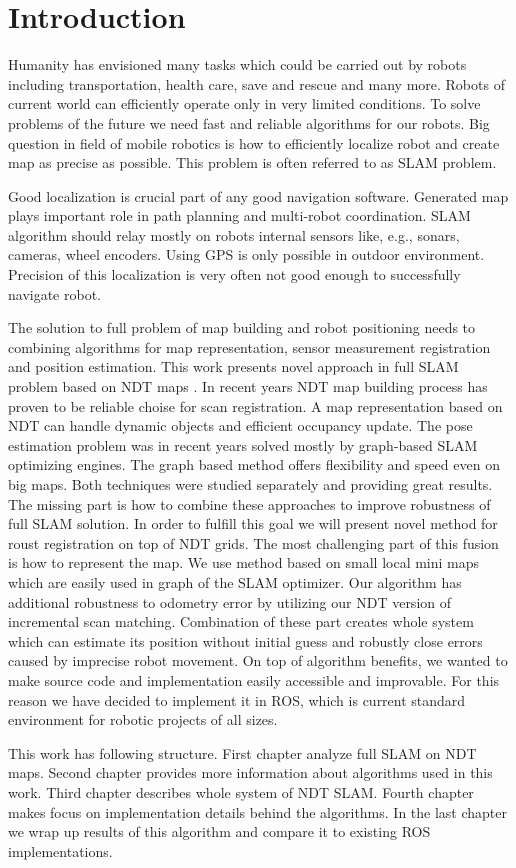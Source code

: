 \chapter*{Introduction}
Humanity has envisioned many tasks which could be carried out by robots including transportation, health care, save and rescue and many more. Robots of current world can efficiently operate only in very limited conditions. To solve problems of the future we need fast and reliable algorithms for our robots. Big question in field of mobile robotics is how to efficiently localize robot and create map as precise as possible. This problem is often referred to as \gls{SLAM} problem.

Good localization is crucial part of any good navigation software. Generated map plays important role in path planning and  multi-robot coordination. SLAM algorithm should relay mostly on robots internal sensors like, e.g., sonars, cameras, wheel encoders. Using \gls{GPS} is only possible in outdoor environment. Precision of this localization is very often not good enough to successfully navigate robot.

The solution to full problem of map building and robot positioning needs to combining algorithms for map representation, sensor measurement registration and position estimation. This work presents novel approach in full \gls{SLAM} problem based on \gls{NDT} maps . In recent years \gls{NDT} map building process has proven to be reliable choise for scan registration. A map representation based on \gls{NDT} can handle dynamic objects and efficient occupancy update. The pose estimation problem was in recent years solved mostly by graph-based \gls{SLAM} optimizing engines. The graph based method offers flexibility and speed even on big maps. Both techniques were studied separately and providing great results. The missing part is how to combine these approaches to improve robustness of full \gls{SLAM} solution. In order to fulfill this goal we will present novel method  for roust registration on top of \gls{NDT} grids. The most challenging part of this fusion is how to represent the map. We use method based on small local mini maps which are easily used in graph of the \gls{SLAM} optimizer. Our algorithm has additional robustness to odometry error by utilizing our \gls{NDT} version of incremental scan matching. Combination of these part creates whole system which can estimate its position without initial guess and robustly close errors caused by imprecise robot movement. On top of algorithm benefits, we wanted to make source code and implementation easily accessible and improvable. For this reason we have decided to implement it in \gls{ROS}, which is current standard environment for robotic projects of all sizes.

This work has following structure. First chapter analyze full \gls{SLAM} on \gls{NDT} maps. Second chapter provides more information about algorithms used in this work. Third chapter describes whole system of NDT SLAM. Fourth chapter makes focus on implementation details behind the algorithms. In the last chapter we wrap up results of this algorithm and compare it to existing \gls{ROS} implementations.  

